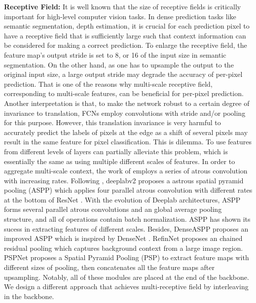 \documentclass[final]{cvpr}
\begin{document}
\textbf{Receptive Field:}
It is well known that the size of receptive fields is critically important for high-level computer vision tasks. In dense prediction tasks like semantic segmentation, depth estimation, it is crucial for each prediction pixel to have a receptive field that is sufficiently large such that context information can be considered for making a correct prediction. To enlarge the receptive field, the feature map's output stride is set to 8, or 16 of the input size in semantic segmentation. On the other hand, as one has to upsample the output to the original input size, a large output stride may degrade the accuracy of per-pixel prediction. That is one of the reasons why multi-scale receptive field, corresponding to multi-scale features, can be beneficial for per-pixel prediction. Another interpretation is that, to make the network robust to a certain degree of invariance to translation, FCNs employ convolutions with stride and/or pooling for this purpose. However, this translation invariance is very harmful to accurately predict the labels of pixels at the edge as a shift of several pixels may result in the same feature for pixel classification. This is dilemma. To use features from different levels of layers can partially alleviate this problem, which is essentially the same as using multiple different scales of features. In order to aggregate multi-scale context, the work of \cite{yu2015multi} employs a series of atrous convolution with increasing rates. Following \cite{yu2015multi}, deeplabv2 \cite{Deeplabv2} proposes a astrous spatial pyramid pooling (ASPP) which applies four parallel atrous convolution with different rates at the bottom of ResNet \cite{ResNet}. With the  evolution of Deeplab architectures, ASPP forms several parallel atrous convolutions and an global average pooling structure, and all of operations contain batch normalization. ASPP has shown  its  sucess in extracting features of different scales. Besides, DenseASPP \cite{DenseASPP} proposes an improved ASPP which is inspired by DenseNet \cite{DenseNet}. RefinNet \cite{RefineNet} proposes an chained residual pooling which captures background context from a large image region. PSPNet \cite{PSPNet} proposes a Spatial Pyramid Pooling (PSP) to extract feature maps with different sizes  of pooling, then concatenates all the feature maps after upsampling. Notably, all of these modules are placed at the end of the backbone. We design a different approach that achieves multi-receptive field by interleaving in the backbone.
\end{document}
